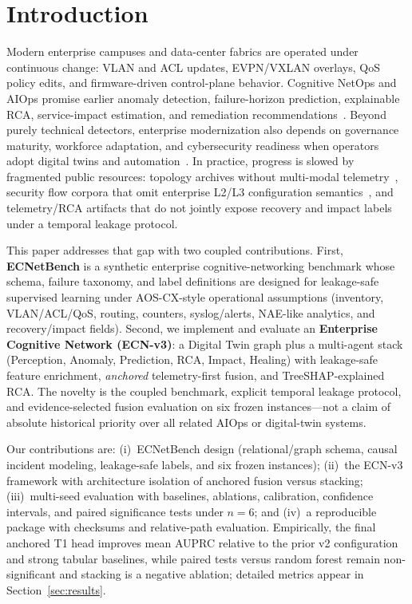 \section{Introduction}
\label{sec:intro}

Modern enterprise campuses and data-center fabrics are operated under continuous change: VLAN and ACL updates, EVPN/VXLAN overlays, QoS policy edits, and firmware-driven control-plane behavior. Cognitive NetOps and AIOps promise earlier anomaly detection, failure-horizon prediction, explainable RCA, service-impact estimation, and remediation recommendations~\cite{dang2019aiops,notaro2021survey,almasan2022ndt}. Beyond purely technical detectors, enterprise modernization also depends on governance maturity, workforce adaptation, and cybersecurity readiness when operators adopt digital twins and automation~\cite{rah2026dtbeyond,rah2026dtfails,rah2026govresistance,rah2026govdtcyber}. In practice, progress is slowed by fragmented public resources: topology archives without multi-modal telemetry~\cite{knight2011topologyzoo}, security flow corpora that omit enterprise L2/L3 configuration semantics~\cite{moustafa2015unsw}, and telemetry/RCA artifacts that do not jointly expose recovery and impact labels under a temporal leakage protocol.

This paper addresses that gap with two coupled contributions. First, \textbf{ECNetBench} is a synthetic enterprise cognitive-networking benchmark whose schema, failure taxonomy, and label definitions are designed for leakage-safe supervised learning under AOS-CX-style operational assumptions (inventory, VLAN/ACL/QoS, routing, counters, syslog/alerts, NAE-like analytics, and recovery/impact fields). Second, we implement and evaluate an \textbf{Enterprise Cognitive Network (ECN-v3)}: a Digital Twin graph plus a multi-agent stack (Perception, Anomaly, Prediction, RCA, Impact, Healing) with leakage-safe feature enrichment, \emph{anchored} telemetry-first fusion, and TreeSHAP-explained RCA. The novelty is the coupled benchmark, explicit temporal leakage protocol, and evidence-selected fusion evaluation on six frozen instances---not a claim of absolute historical priority over all related AIOps or digital-twin systems.

Our contributions are: (i)~ECNetBench design (relational/graph schema, causal incident modeling, leakage-safe labels, and six frozen instances); (ii)~the ECN-v3 framework with architecture isolation of anchored fusion versus stacking; (iii)~multi-seed evaluation with baselines, ablations, calibration, confidence intervals, and paired significance tests under $n{=}6$; and (iv)~a reproducible package with checksums and relative-path evaluation. Empirically, the final anchored T1 head improves mean AUPRC relative to the prior v2 configuration and strong tabular baselines, while paired tests versus random forest remain non-significant and stacking is a negative ablation; detailed metrics appear in Section~\ref{sec:results}.

